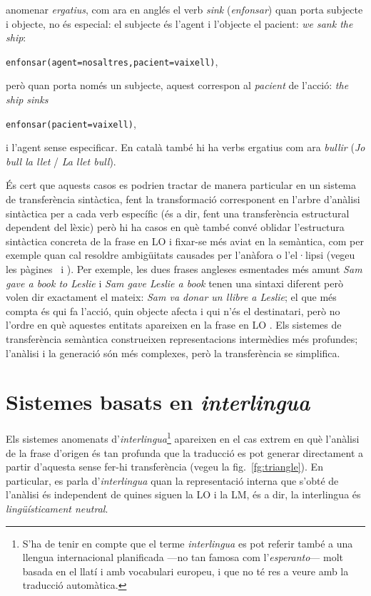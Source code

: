 \begin{itemize}
  anomenar \emph{ergatius}, com ara en anglés el verb \emph{sink}
  (\emph{enfonsar}) quan porta subjecte i objecte, no és especial: el
  subjecte és l'agent i l'objecte el pacient: \emph{we sank the ship}:
  \begin{center}
    \texttt{enfonsar(agent=nosaltres,pacient=vaixell)},
  \end{center}
  però quan porta només un subjecte, aquest correspon al
  \emph{pacient} de l'acció: \emph{the ship sinks}
  \begin{center}
    \texttt{enfonsar(pacient=vaixell)},
  \end{center}
  i l'agent sense especificar. En català també hi ha verbs ergatius
  com ara \emph{bullir} (\emph{Jo bull la llet} / \emph{La llet
    bull}).
\end{itemize}

És cert que aquests casos es podrien tractar de manera particular en
un sistema de transferència sintàctica, fent la transformació
corresponent en l'arbre d'anàlisi sintàctica per a cada verb específic
(és a dir, fent una transferència estructural dependent del lèxic)
però hi ha casos en què també convé oblidar l'estructura sintàctica
concreta de la frase en LO i fixar-se més aviat en la semàntica, com
per exemple quan cal resoldre ambigüitats causades per l'anàfora o
l'el·lipsi (vegeu les pàgines~\pageref{pg:anafora} i
\pageref{pg:ellipsi}).  Per exemple, les dues frases angleses
esmentades més amunt \emph{Sam gave a book to Leslie} i \emph{Sam gave
  Leslie a book} tenen una sintaxi diferent però volen dir exactament
el mateix: \emph{Sam va donar un llibre a Leslie}; el que més compta és
qui fa l'acció, quin objecte afecta i qui n'és el destinatari, però no
l'ordre en què aquestes entitats apareixen en la frase en LO
\citep{arnold93j}. Els sistemes de transferència semàntica
construeixen representacions intermèdies més profundes; l'anàlisi i la
generació són més complexes, però la transferència se simplifica.

\section{Sistemes basats en \emph{interlingua}}
\label{ss:interlingua}

Els sistemes anomenats d'\emph{interlingua}\footnote{S'ha de tenir en
  compte que el terme \emph{interlingua} es pot referir també a una
  llengua internacional planificada ---no tan famosa com
  l'\emph{esperanto}--- molt basada en el llatí i amb vocabulari
  europeu, i que no té res a veure amb la traducció automàtica.}
apareixen en el cas extrem en què l'anàlisi de la frase d'origen és
tan profunda que la traducció es pot generar directament a partir
d'aquesta sense fer-hi transferència (vegeu la
fig.~\ref{fg:triangle}). En particular, es parla d'\emph{interlingua}
quan la representació interna que s'obté de l'anàlisi és independent
de quines siguen la LO i la LM, és a dir, la interlingua és {\em
  lingüísticament neutral}.

